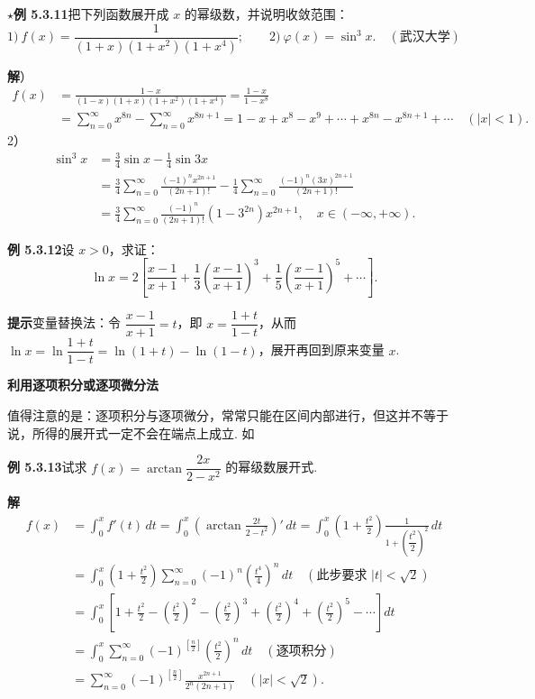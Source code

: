 \documentclass[UTF8,12pt,a4paper,fontset=fandol]{ctexart}
\begin{document}
\noindent\(\star\)\textbf{例 5.3.11}\quad 把下列函数展开成 $x$ 的幂级数，并说明收敛范围：
\[
  1)\ f(x)=\frac1{(1+x)(1+x^2)(1+x^4)};\qquad
  2)\ \varphi(x)=\sin^3x.\quad(\text{武汉大学})
\]

\noindent\textbf{解}）
\[
\begin{aligned}
f(x)
&=\frac{1-x}{(1-x)(1+x)(1+x^2)(1+x^4)}
=\frac{1-x}{1-x^8}\\
&=\sum_{n=0}^{\infty}x^{8n}-\sum_{n=0}^{\infty}x^{8n+1}
=1-x+x^8-x^9+\cdots+x^{8n}-x^{8n+1}+\cdots\quad(|x|<1).
\end{aligned}
\]
2）
\[
\begin{aligned}
\sin^3x
&=\frac34\sin x-\frac14\sin3x\\
&=\frac34\sum_{n=0}^{\infty}\frac{(-1)^nx^{2n+1}}{(2n+1)!}
-\frac14\sum_{n=0}^{\infty}\frac{(-1)^n(3x)^{2n+1}}{(2n+1)!}\\
&=\frac34\sum_{n=0}^{\infty}\frac{(-1)^n}{(2n+1)!}\left(1-3^{2n}\right)x^{2n+1},
\quad x\in(-\infty,+\infty).
\end{aligned}
\]

\noindent\textbf{例 5.3.12}\quad 设 $x>0$，求证：
\[
  \ln x=2\left[\frac{x-1}{x+1}+\frac13\left(\frac{x-1}{x+1}\right)^3
  +\frac15\left(\frac{x-1}{x+1}\right)^5+\cdots\right].
\]

\noindent\textbf{提示}\quad 变量替换法：令 $\dfrac{x-1}{x+1}=t$，即
$x=\dfrac{1+t}{1-t}$，从而
$\ln x=\ln\dfrac{1+t}{1-t}=\ln(1+t)-\ln(1-t)$，展开再回到原来变量 $x$.

\noindent\textbf{利用逐项积分或逐项微分法}

值得注意的是：逐项积分与逐项微分，常常只能在区间内部进行，但这并不等于说，所得的展开式一定不会在端点上成立. 如

\noindent\textbf{例 5.3.13}\quad 试求 $f(x)=\arctan\dfrac{2x}{2-x^2}$ 的幂级数展开式.

\noindent\textbf{解}\quad
\[
\begin{aligned}
f(x)
&=\int_0^x f'(t)\,dt
=\int_0^x\left(\arctan\frac{2t}{2-t^2}\right)'\,dt
=\int_0^x\left(1+\frac{t^2}{2}\right)\frac1{1+\left(\dfrac{t^2}{2}\right)^2}\,dt\\
&=\int_0^x\left(1+\frac{t^2}{2}\right)
\sum_{n=0}^{\infty}(-1)^n\left(\frac{t^4}{4}\right)^n\,dt
\quad(\text{此步要求 }|t|<\sqrt2)\\
&=\int_0^x\left[1+\frac{t^2}{2}-\left(\frac{t^2}{2}\right)^2
-\left(\frac{t^2}{2}\right)^3+\left(\frac{t^2}{2}\right)^4
+\left(\frac{t^2}{2}\right)^5-\cdots\right]dt\\
&=\int_0^x\sum_{n=0}^{\infty}(-1)^{\left[\frac n2\right]}
\left(\frac{t^2}{2}\right)^n\,dt\quad(\text{逐项积分})\\
&=\sum_{n=0}^{\infty}(-1)^{\left[\frac n2\right]}
\frac{x^{2n+1}}{2^n(2n+1)}\quad(|x|<\sqrt2).
\end{aligned}
\]
\end{document}
